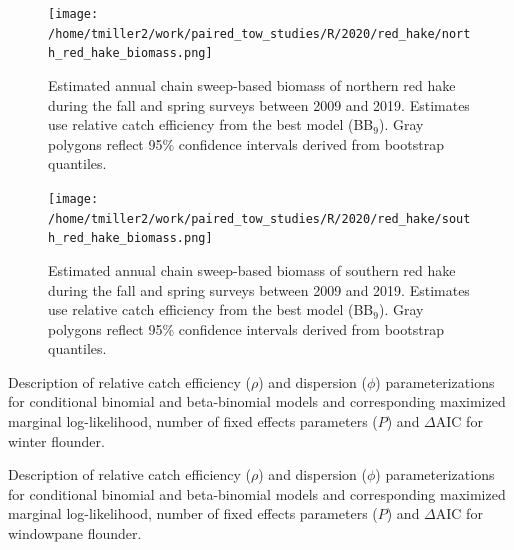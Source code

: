 \documentclass[12pt,letterpaper, leqno]{article}
\def\Little{\fontsize{10pt}{10pt}\selectfont}
\begin{document}
\begin{figure}
\caption{Estimated annual chain sweep-based biomass of northern red hake during the fall and spring surveys between 2009 and 2019. Estimates use relative catch efficiency from the best model (BB$_9$). Gray polygons reflect 95\% confidence intervals derived from bootstrap quantiles.}\label{north_red_hake_biomass}
\begin{center}
\texttt{[image: /home/tmiller2/work/paired\_tow\_studies/R/2020/red\_hake/north\_red\_hake\_biomass.png]}
\end{center}
\end{figure}

\begin{figure}
\caption{Estimated annual chain sweep-based biomass of southern red hake during the fall and spring surveys between 2009 and 2019. Estimates use relative catch efficiency from the best model (BB$_9$). Gray polygons reflect 95\% confidence intervals derived from bootstrap quantiles.}\label{south_red_hake_biomass}
\begin{center}
\texttt{[image: /home/tmiller2/work/paired\_tow\_studies/R/2020/red\_hake/south\_red\_hake\_biomass.png]}
\end{center}
\end{figure}



%

\begin{landscape}
\begin{table}\caption{Description of relative catch efficiency ($\rho$) and dispersion ($\phi$) parameterizations for conditional binomial and beta-binomial models and corresponding maximized marginal log-likelihood, number of fixed effects parameters ($P$) and $\Delta$AIC for winter flounder.}\label{models_table_winter}
{\Little  }
\end{table}
\end{landscape}

\begin{landscape}
\begin{table}\caption{Description of relative catch efficiency ($\rho$) and dispersion ($\phi$) parameterizations for conditional binomial and beta-binomial models and corresponding maximized marginal log-likelihood, number of fixed effects parameters ($P$) and $\Delta$AIC for windowpane flounder.}\label{models_table_windowpane}
{\Little  }
\end{table}
\end{landscape}
\end{document}
